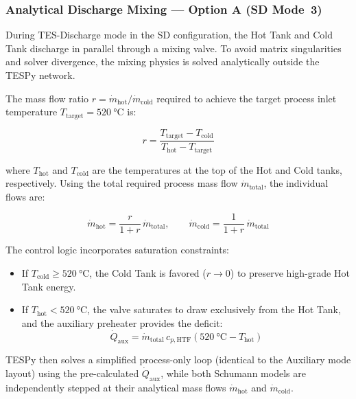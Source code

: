 \documentclass[11pt,review,3p]{elsarticle}
\begin{document}
\subsubsection{Analytical Discharge Mixing --- Option A (SD Mode~3)}
\label{sec:analytical_mixing}

During TES-Discharge mode in the SD configuration, the Hot Tank and Cold Tank discharge in parallel through a mixing valve. To avoid matrix singularities and solver divergence, the mixing physics is solved analytically outside the TESPy network.

The mass flow ratio $r = \dot{m}_{\text{hot}} / \dot{m}_{\text{cold}}$ required to achieve the target process inlet temperature $T_{\text{target}} = \SI{520}{\celsius}$ is:

\begin{equation}
    r = \frac{T_{\text{target}} - T_{\text{cold}}}{T_{\text{hot}} - T_{\text{target}}}
    \label{eq:mixing_ratio}
\end{equation}

where $T_{\text{hot}}$ and $T_{\text{cold}}$ are the temperatures at the top of the Hot and Cold tanks, respectively. Using the total required process mass flow $\dot{m}_{\text{total}}$, the individual flows are:

\begin{equation}
    \dot{m}_{\text{hot}} = \frac{r}{1+r}\,\dot{m}_{\text{total}}, \qquad \dot{m}_{\text{cold}} = \frac{1}{1+r}\,\dot{m}_{\text{total}}
    \label{eq:split_flows}
\end{equation}

The control logic incorporates saturation constraints:
\begin{itemize}[leftmargin=*, itemsep=2pt]
    \item If $T_{\text{cold}} \ge \SI{520}{\celsius}$, the Cold Tank is favored ($r \to 0$) to preserve high-grade Hot Tank energy.
    \item If $T_{\text{hot}} < \SI{520}{\celsius}$, the valve saturates to draw exclusively from the Hot Tank, and the auxiliary preheater provides the deficit:
    \begin{equation}
        \dot{Q}_{\text{aux}} = \dot{m}_{\text{total}}\,c_{p,\text{HTF}} \left(\SI{520}{\celsius} - T_{\text{hot}}\right)
        \label{eq:aux_shortfall}
    \end{equation}
\end{itemize}

TESPy then solves a simplified process-only loop (identical to the Auxiliary mode layout) using the pre-calculated $\dot{Q}_{\text{aux}}$, while both Schumann models are independently stepped at their analytical mass flows $\dot{m}_{\text{hot}}$ and $\dot{m}_{\text{cold}}$.
\end{document}

